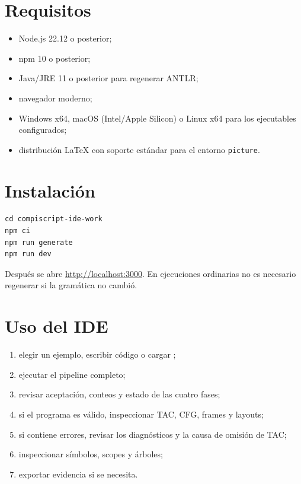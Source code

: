 \documentclass[11pt,letterpaper,oneside]{report}
\newcommand{\archivo}[1]{\path{#1}}
\newcommand{\codigo}[1]{\texttt{#1}}
\begin{document}
\section{Requisitos}

\begin{itemize}
  \item Node.js 22.12 o posterior;
  \item npm 10 o posterior;
  \item Java/JRE 11 o posterior para regenerar ANTLR;
  \item navegador moderno;
  \item Windows x64, macOS (Intel/Apple Silicon) o Linux x64 para los ejecutables configurados;
  \item distribución LaTeX con soporte estándar para el entorno \codigo{picture}.
\end{itemize}

\section{Instalación}

\begin{verbatim}
cd compiscript-ide-work
npm ci
npm run generate
npm run dev
\end{verbatim}

Después se abre \url{http://localhost:3000}. En ejecuciones ordinarias no es necesario
regenerar si la gramática no cambió.

\section{Uso del IDE}

\begin{enumerate}
  \item elegir un ejemplo, escribir código o cargar \archivo{.cps};
  \item ejecutar el pipeline completo;
  \item revisar aceptación, conteos y estado de las cuatro fases;
  \item si el programa es válido, inspeccionar TAC, CFG, frames y layouts;
  \item si contiene errores, revisar los diagnósticos y la causa de omisión de TAC;
  \item inspeccionar símbolos, scopes y árboles;
  \item exportar evidencia si se necesita.
\end{enumerate}
\end{document}
